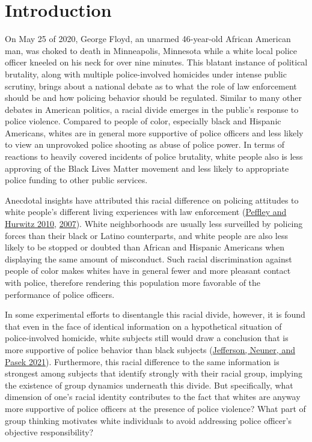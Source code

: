 \documentclass[
  12pt,
]{article}
\begin{document}
\hypertarget{introduction}{%
\section{Introduction}\label{introduction}}

On May 25 of 2020, George Floyd, an unarmed 46-year-old African American
man, was choked to death in Minneapolis, Minnesota while a white local
police officer kneeled on his neck for over nine minutes. This blatant
instance of political brutality, along with multiple police-involved
homicides under intense public scrutiny, brings about a national debate
as to what the role of law enforcement should be and how policing
behavior should be regulated. Similar to many other debates in American
politics, a racial divide emerges in the public's response to police
violence. Compared to people of color, especially black and Hispanic
Americans, whites are in general more supportive of police officers and
less likely to view an unprovoked police shooting as abuse of police
power. In terms of reactions to heavily covered incidents of police
brutality, white people also is less approving of the Black Lives Matter
movement and less likely to appropriate police funding to other public
services.

Anecdotal insights have attributed this racial difference on policing
attitudes to white people's different living experiences with law
enforcement (\protect\hyperlink{ref-peffley2010}{Peffley and Hurwitz
2010}, \protect\hyperlink{ref-peffley2007}{2007}). White neighborhoods
are usually less surveilled by policing forces than their black or
Latino counterparts, and white people are also less likely to be stopped
or doubted than African and Hispanic Americans when displaying the same
amount of misconduct. Such racial discrimination against people of color
makes whites have in general fewer and more pleasant contact with
police, therefore rendering this population more favorable of the
performance of police officers.

In some experimental efforts to disentangle this racial divide, however,
it is found that even in the face of identical information on a
hypothetical situation of police-involved homicide, white subjects still
would draw a conclusion that is more supportive of police behavior than
black subjects (\protect\hyperlink{ref-jefferson2021}{Jefferson, Neuner,
and Pasek 2021}). Furthermore, this racial difference to the same
information is strongest among subjects that identify strongly with
their racial group, implying the existence of group dynamics underneath
this divide. But specifically, what dimension of one's racial identity
contributes to the fact that whites are anyway more supportive of police
officers at the presence of police violence? What part of group thinking
motivates white individuals to avoid addressing police officer's
objective responsibility?
\end{document}
